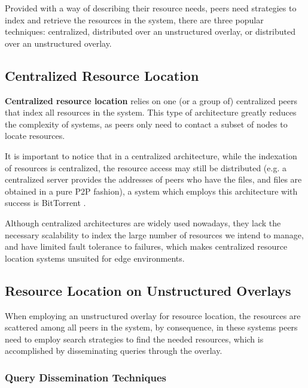 Provided with a way of describing their resource needs, peers need strategies to index and retrieve the resources in the system, there are three popular techniques: centralized, distributed over an unstructured overlay, or distributed over an unstructured overlay.

\subsection{Centralized Resource Location}

\textbf{Centralized resource location} relies on one (or a group of) centralized peers that index all resources in the system. This type of architecture greatly reduces the complexity of systems, as peers only need to contact a subset of nodes to locate resources. 

It is important to notice that in a centralized architecture, while the indexation of resources is centralized, the resource access may still be distributed (e.g. a centralized server provides the addresses of peers who have the files, and files are obtained in a pure P2P fashion), a system which employs this architecture with success is BitTorrent \cite{cohen2003incentives}.

Although centralized architectures are widely used nowadays, they lack the necessary scalability to index the large number of resources we intend to manage, and have limited fault tolerance to failures, which makes centralized resource location systems unsuited for edge environments. 


\subsection{Resource Location on Unstructured Overlays}

When employing an unstructured overlay for resource location, the resources are scattered among all peers in the system, by consequence, in these systems peers need to employ search strategies to find the needed resources, which is accomplished by disseminating queries through the overlay.

\subsubsection{Query Dissemination Techniques}

